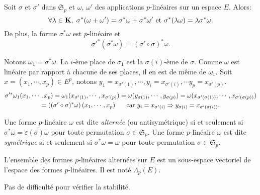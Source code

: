 \begin{propn} \label{sigma*}
Soit $\sigma$ et $\sigma'$ dans $\mathfrak S_p$ et $\omega$, $\omega'$ des applications $p$-linéaires sur un espace $E$. Alors:
\begin{displaymath}
\forall \lambda \in \mathbf{K}, \;  \sigma^*(\omega + \omega') = \sigma^*\omega + \sigma^* \omega' \text{ et }\sigma^*(\lambda \omega) = \lambda \sigma^* \omega .
\end{displaymath}
De plus, la forme $\sigma^*\omega$ est $p$-linéaire et 
\begin{displaymath}
 \sigma'^*(\sigma^* \omega) = (\sigma' \circ \sigma)^*\omega .
\end{displaymath}
\end{propn}
\begin{demo}
Notons $\omega_1=\sigma^* \omega$. La $i$-ème place de $\sigma_1$ est la $\sigma(i)$-ème de $\sigma$. Comme $\omega$ est linéaire par rapport à chacune de ses places, il en est de même de $\omega_1$.\newline
Soit $x = (x_1,\cdots,x_p)\in E^p$, notons $y_1=x_{\sigma'(1)}, \cdots ,y_i=x_{\sigma'(i)},\cdots y_p = x_{\sigma'(p)}$.
\begin{multline*}
\sigma'^* \omega_1(x_1,\cdots,x_p) = \omega_1(x_{\sigma'(1)}, \cdots, x_{\sigma'(p)})
= \omega(y_{\sigma(1)},\cdots,y_{\sigma(p)})
= \omega(x_{\sigma'(\sigma(1))}, \cdots, x_{\sigma'(\sigma(p))})\\
= \left( (\sigma'\circ \sigma)^* \omega\right)(x_1,\cdots,x_p) \hspace{0.5cm}
\text{ car } y_i=x_{\sigma'(i)} \Rightarrow y_{\sigma(i)}=x_{\sigma'(\sigma(i))}.
\end{multline*}
\end{demo}
 
\begin{defi}
 Une forme $p$-linéaire $\omega$ est dite \emph{alternée} (ou antisymétrique) si et seulement si $\sigma^*\omega=\varepsilon(\sigma)\omega$ pour toute permutation $\sigma\in \mathfrak S_p$.\newline
Une forme $p$-linéaire $\omega$  est dite \emph{symétrique} si et seulement si $\sigma^*\omega=\omega$ pour toute permutation $\sigma\in \mathfrak S_p$.
\end{defi}
\begin{propn}
  L'ensemble des formes $p$-linéaires alternées sur $E$ est un sous-espace vectoriel de l'espace des formes $p$-linéaires. Il est noté $\Lambda_p(E)$.
\end{propn}
\begin{demo}
  Pas de difficulté pour vérifier la stabilité.
\end{demo}

